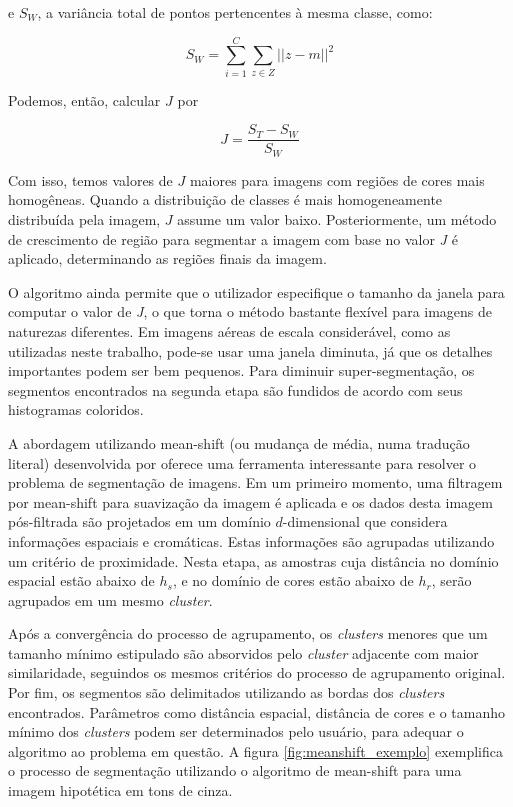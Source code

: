 e $S_W$, a variância total de pontos pertencentes à mesma classe, como:

\begin{equation}
	\displaystyle S_W = \sum_{i=1}^C \sum_{z \in Z} || z - m ||^2
\end{equation}

Podemos, então, calcular $J$ por

\begin{equation}
	\displaystyle J = \frac{S_T - S_W}{S_W}
\end{equation}

Com isso, temos valores de $J$ maiores para imagens com regiões de cores mais homogêneas. Quando a distribuição de classes é mais homogeneamente distribuída pela imagem, $J$ assume um valor baixo. Posteriormente, um método de crescimento de região para segmentar a imagem com base no valor \textit{J} é aplicado, determinando as regiões finais da imagem.

O algoritmo ainda permite que o utilizador especifique o tamanho da janela para computar o valor de \textit{J}, o que torna o método bastante flexível para imagens de naturezas diferentes. Em imagens aéreas de escala considerável, como as utilizadas neste trabalho, pode-se usar uma janela diminuta, já que os detalhes importantes podem ser bem pequenos. Para diminuir super-segmentação, os segmentos encontrados na segunda etapa são fundidos de acordo com seus histogramas coloridos.


A abordagem utilizando mean-shift (ou mudança de média, numa tradução literal) desenvolvida por  oferece uma ferramenta interessante para resolver o problema de segmentação de imagens. Em um primeiro momento, uma filtragem por mean-shift para suavização da imagem é aplicada e os dados desta imagem pós-filtrada são projetados em um domínio $d$-dimensional que considera informações espaciais e cromáticas. Estas informações são agrupadas utilizando um critério de proximidade. Nesta etapa, as amostras cuja distância no domínio espacial estão abaixo de $h_s$, e no domínio de cores estão abaixo de $h_r$, serão agrupados em um mesmo \textit{cluster}.

Após a convergência do processo de agrupamento, os \textit{clusters} menores que um tamanho mínimo estipulado são absorvidos pelo \textit{cluster} adjacente com maior similaridade, seguindos os mesmos critérios do processo de agrupamento original. Por fim, os segmentos são delimitados utilizando as bordas dos \textit{clusters} encontrados. Parâmetros como distância espacial, distância de cores e o tamanho mínimo dos \textit{clusters} podem ser determinados pelo usuário, para adequar o algoritmo ao problema em questão. A figura \ref{fig:meanshift_exemplo} exemplifica o processo de segmentação utilizando o algoritmo de mean-shift para uma imagem hipotética em tons de cinza.

